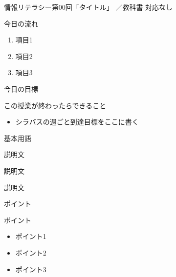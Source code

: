 \documentclass[aspectratio=43,professionalfonts,handout]{beamer}
\newcommand{\LectureNum}{00}          %
\newcommand{\LectureTitle}{タイトル}   %
\newcommand{\CourseName}{情報リテラシー}
\newcommand{\TextPages}{対応なし}      %
\begin{document}

\begin{frame}{\CourseName\quad 第\LectureNum 回「\LectureTitle 」}
  {\small \TermName\quad \TeacherName\quad ／\quad 教科書 \TextPages}

  \vfill

  \begin{block}{今日の流れ}
    \begin{enumerate}
      \item 項目1
      \item 項目2
      \item 項目3
    \end{enumerate}
  \end{block}
\end{frame}


\begin{frame}{今日の目標}
  \begin{block}{この授業が終わったらできること}
    \begin{itemize}
      \item シラバスの週ごと到達目標をここに書く
    \end{itemize}
  \end{block}
\end{frame}


\begin{frame}{基本用語}
  \begin{description}[labelwidth=6em]
    \item[\kw{用語1}]
      説明文
    \item[\kw{用語2}]
      説明文
    \item[\kw{用語3}]
      説明文
  \end{description}
\end{frame}


\begin{frame}{ポイント}
  \begin{block}{ポイント}
    \begin{itemize}
      \item ポイント1
      \item ポイント2
      \item ポイント3
    \end{itemize}
  \end{block}
\end{frame}
\end{document}
